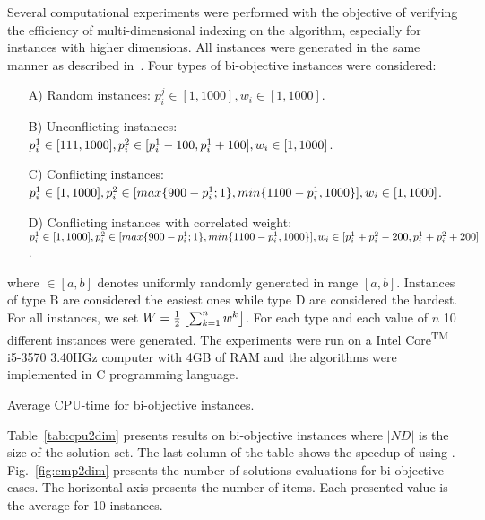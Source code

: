 Several computational experiments were performed with the objective of
verifying the efficiency of multi-dimensional indexing on the algorithm,
especially for instances with higher dimensions.
All instances were generated in the same manner as described in~\cite{bazgan2009}.
Four types of bi-objective instances were considered:
\begin{enumerate}
  \item[A)] Random instances: $
    p^j_i \in [1, 1000],
    w_i \in [1,1000]$.
  \item[B)] Unconflicting instances: $
    p^1_i \in [111, 1000],\\
    p^2_i \in [p^1_i - 100, p^1_i + 100],\\
    w_i \in [1,1000]$.
  \item[C)] Conflicting instances: $
    p^1_i \in [1, 1000],\\
    p^2_i \in [max\{900-p^1_i;1\}, min\{1100-p^1_i, 1000\}],\\
    w_i \in [1,1000]$.
  \item[D)] Conflicting instances with correlated weight: $
    p^1_i \in [1, 1000],\\
    p^2_i \in [max\{900-p^1_i;1\}, min\{1100-p^1_i, 1000\}],\\
    w_i \in [p^1_i+p^2_i-200, p^1_i+p^2_i+200]$.
\end{enumerate}
where $\in [a,b]$ denotes uniformly randomly generated in range $[a,b]$.
Instances of type B are considered the easiest ones
while type D are considered the hardest.
For all instances, we set $W=\frac{1}{2}\left \lfloor{\sum^n_{k=1} w^k}\right \rfloor$.
For each type and each value of $n$ 10 different instances were generated.
The experiments were run on a Intel\textsuperscript{\textregistered}
Core\textsuperscript{TM} i5-3570 3.40HGz computer with 4GB of RAM and
the algorithms were implemented in C programming language.

\begin{table}[]
  \centering
  
  \caption{Average CPU-time for bi-objective instances.}
  \label{tab:cpu2dim}
\end{table}

Table~\ref{tab:cpu2dim} presents results on bi-objective instances
where $|ND|$ is the size of the solution set.
The last column of the table shows the speedup of using .
Fig.~\ref{fig:cmp2dim} presents the number of solutions
evaluations for bi-objective cases.
The horizontal axis presents the number of items.
Each presented value is the average for 10 instances.

